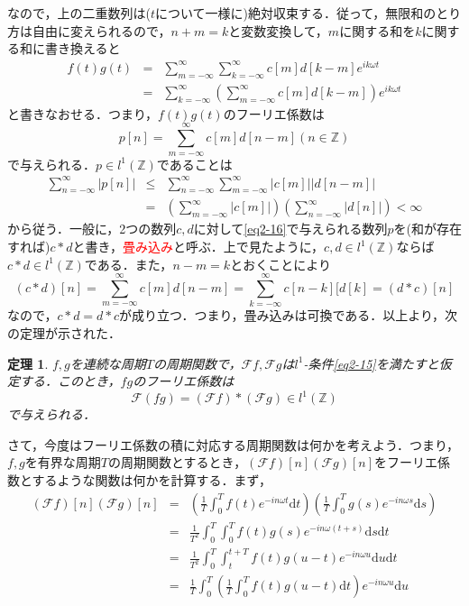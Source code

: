 \documentclass[a4j]{jsbook}
\newtheorem{theorem}{定理}
\numberwithin{theorem}{chapter}  %
\begin{document}
なので，上の二重数列は(\(t\)について一様に)絶対収束する．従って，無限和のとり方は自由に変えられるので，\(n+m=k\)と変数変換して，\(m\)に関する和を\(k\)に関する和に書き換えると
\begin{eqnarray*}
f(t)g(t)&=&\sum_{m=-\infty}^\infty\sum_{k=-\infty}^\infty c[m]d[k-m]e^{ik\omega t} \\
&=&\sum_{k=-\infty}^\infty\left(\sum_{m=-\infty}^\infty c[m]d[k-m]\right)e^{ik\omega t}
\end{eqnarray*}
と書きなおせる．つまり，\(f(t)g(t)\)のフーリエ係数は
\begin{equation}
    p[n]=\sum_{m=-\infty}^\infty c[m]d[n-m] (n\in\mathbb{Z}) \label{eq2-16}
\end{equation}
で与えられる．\(p\in l^1(\mathbb{Z})\)であることは
\begin{eqnarray*}
\sum_{n=-\infty}^\infty |p[n]|&\leq&\sum_{n=-\infty}^\infty\sum_{m=-\infty}^\infty|c[m]||d[n-m]| \\
&=&\left(\sum_{m=-\infty}^\infty|c[m]|\right)\left(\sum_{n=-\infty}^\infty|d[n]|\right)<\infty
\end{eqnarray*}
から従う．一般に，2つの数列\(c, d\)に対して\eqref{eq2-16}で与えられる数列\(p\)を(和が存在すれば)\(c*d\)と書き，\textcolor{red}{畳み込み}と呼ぶ．上で見たように，\(c, d\in l^1(\mathbb{Z})\)ならば\(c*d\in l^1(\mathbb{Z})\)である．また，\(n-m=k\)とおくことにより
\begin{equation*}
    (c*d)[n]=\sum_{m=-\infty}^\infty c[m]d[n-m]=\sum_{k=-\infty}^\infty c[n-k][d[k]=(d*c)[n]
\end{equation*}
なので，\(c*d=d*c\)が成り立つ．つまり，畳み込みは可換である．以上より，次の定理が示された．
\begin{theorem}
\label{th2-11}
\(f, g\)を連続な周期\(T\)の周期関数で，\(\mathcal{F}f, \mathcal{F}g\)は\(l^1\)-条件\eqref{eq2-15}を満たすと仮定する．このとき，\(fg\)のフーリエ係数は
\begin{equation*}
    \mathcal{F}(fg)=(\mathcal{F}f)*(\mathcal{F}g)\in l^1(\mathbb{Z})
\end{equation*}
で与えられる．
\end{theorem}
さて，今度はフーリエ係数の積に対応する周期関数は何かを考えよう．つまり，\(f, g\)を有界な周期\(T\)の周期関数とするとき，\((\mathcal{F}f)[n](\mathcal{F}g)[n]\)をフーリエ係数とするような関数は何かを計算する．まず，
\begin{eqnarray*}
(\mathcal{F}f)[n](\mathcal{F}g)[n]&=&\left(\frac{1}{T}\int_0^T f(t)e^{-in\omega t}\mathrm{d}t\right)\left(\frac{1}{T}\int_0^T g(s)e^{-in\omega s}\mathrm{d}s\right) \\
&=&\frac{1}{T^2}\int_0^T\int_0^T f(t)g(s)e^{-in\omega(t+s)}\mathrm{d}s\mathrm{d}t \\
&=&\frac{1}{T^2}\int_0^T\int_t^{t+T} f(t)g(u-t)e^{-in\omega u}\mathrm{d}u\mathrm{d}t \\
&=&\frac{1}{T}\int_0^T\left(\frac{1}{T}\int_0^T f(t)g(u-t)\mathrm{d}t\right)e^{-in\omega u}\mathrm{d}u
\end{eqnarray*}
\end{document}

